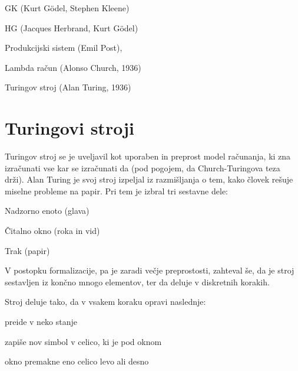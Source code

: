 \documentclass[10pt,a4paper,oneside]{book}
\begin{document}
\begin{items}
    \item GK (Kurt Gödel, Stephen Kleene) 
    \item HG (Jacques Herbrand, Kurt Gödel)
    \item Produkcijski sistem (Emil Post), %
    \item Lambda račun (Alonso Church, 1936)
    \item Turingov stroj (Alan Turing, 1936)
\end{items}

\pagebreak
\section{Turingovi stroji}
Turingov stroj se je uveljavil kot uporaben in preprost model računanja, ki zna izračunati vse kar se izračunati da (pod pogojem, da Church-Turingova teza drži). Alan Turing je svoj stroj izpeljal iz razmišljanja o tem, kako človek rešuje miselne probleme na papir. Pri tem je izbral tri sestavne dele:
\begin{items}
\item Nadzorno enoto (glava)
\item Čitalno okno (roka in vid)
\item Trak (papir)
\end{items}
V postopku formalizacije, pa je zaradi večje preprostosti, zahteval še, da je stroj sestavljen iz končno mnogo elementov, ter da deluje v diskretnih korakih.%


Stroj deluje tako, da v vsakem koraku opravi naslednje:
\begin{items}
	\item preide v neko stanje
	\item zapiše nov simbol v celico, ki je pod oknom
	\item okno premakne eno celico levo ali desno
\end{items}
\end{document}
